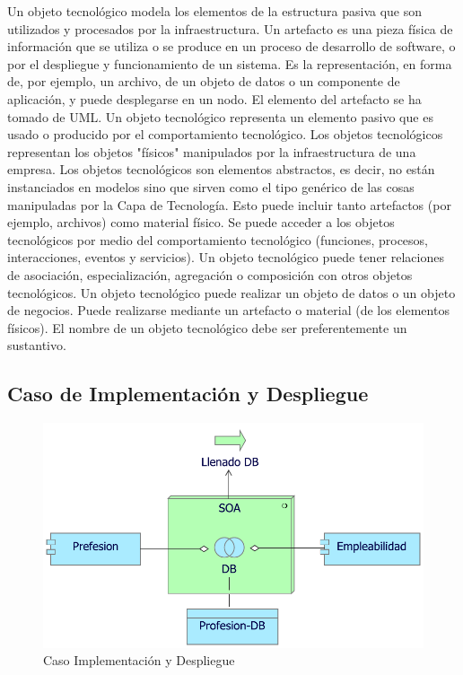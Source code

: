 Un objeto tecnológico modela los elementos de la estructura pasiva que son utilizados y procesados por la infraestructura. Un artefacto es una pieza física de información que se utiliza o se produce en un proceso de desarrollo de software, o por el despliegue y funcionamiento de un sistema. Es la representación, en forma de, por ejemplo, un archivo, de un objeto de datos o un componente de aplicación, y puede desplegarse en un nodo. El elemento del artefacto se ha tomado de UML. Un objeto tecnológico representa un elemento pasivo que es usado o producido por el comportamiento tecnológico. Los objetos tecnológicos representan los objetos "físicos" manipulados por la infraestructura de una empresa. Los objetos tecnológicos son elementos abstractos, es decir, no están instanciados en modelos sino que sirven como el tipo genérico de las cosas manipuladas por la Capa de Tecnología. Esto puede incluir tanto artefactos (por ejemplo, archivos) como material físico.
Se puede acceder a los objetos tecnológicos por medio del comportamiento tecnológico (funciones, procesos, interacciones, eventos y servicios). Un objeto tecnológico puede tener relaciones de asociación, especialización, agregación o composición con otros objetos tecnológicos. Un objeto tecnológico puede realizar un objeto de datos o un objeto de negocios. Puede realizarse mediante un artefacto o material (de los elementos físicos). El nombre de un objeto tecnológico debe ser preferentemente un sustantivo.

\newpage

\subsection{Caso  de Implementación y Despliegue}
\begin{figure}[h!]
	\centering
	\includegraphics[width=.7\linewidth]{imgs/puntos_vista/tecnologia/despliegue.pdf}
	\caption{Caso Implementación y Despliegue}
\end{figure}

